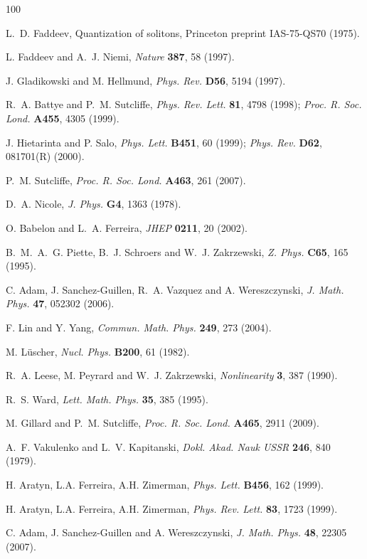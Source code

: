 \documentclass[12pt]{article}
\begin{document}
\begin{thebibliography}{100}


 L.~D. Faddeev,
Quantization of solitons,
Princeton preprint IAS-75-QS70 (1975).

 L. Faddeev and A.~J. Niemi,
\textit{Nature} \textbf{387}, 58 (1997).

 J. Gladikowski and M. Hellmund,
\textit{Phys. Rev.} \textbf{D56}, 5194 (1997).

 R.~A. Battye and P.~M. Sutcliffe,
\textit{Phys. Rev. Lett.} \textbf{81}, 4798 (1998);
\textit{Proc. R. Soc. Lond.} \textbf{A455}, 4305 (1999).

 J. Hietarinta and P. Salo,
\textit{Phys. Lett.} \textbf{B451}, 60 (1999);
\textit{Phys. Rev.} \textbf{D62}, 081701(R) (2000).

 P.~M. Sutcliffe,
\textit{Proc. R. Soc. Lond.} \textbf{A463}, 261 (2007).

 D.~A. Nicole, 
\textit{J. Phys.} \textbf{G4}, 1363 (1978).

O. Babelon and L.~A. Ferreira,
\textit{JHEP} \textbf{0211}, 20 (2002).

B.~M.~A.~G. Piette, B.~J. Schroers and W.~J. Zakrzewski,
\textit{Z. Phys.} \textbf{C65}, 165 (1995).

C. Adam, J. Sanchez-Guillen, R.~A. Vazquez and A. Wereszczynski,
\textit{J. Math. Phys.} \textbf{47}, 052302 (2006).

 F. Lin and Y. Yang,
\textit{Commun. Math. Phys.} \textbf{249}, 273 (2004).

M. L\"uscher, \textit{Nucl. Phys.} \textbf{B200}, 61 (1982).

R.~A. Leese, M. Peyrard and W.~J. Zakrzewski,
\textit{Nonlinearity}  \textbf{3}, 387 (1990).

R.~S. Ward,
\textit{Lett. Math. Phys.} \textbf{35}, 385 (1995).

M. Gillard and P.~M. Sutcliffe,
\textit{Proc. R. Soc. Lond.} \textbf{A465}, 2911 (2009).

A.~F. Vakulenko and L.~V. Kapitanski,
\textit{Dokl. Akad. Nauk USSR} \textbf{246}, 840 (1979).

H. Aratyn, L.A. Ferreira, A.H. Zimerman,
\textit{Phys. Lett.} \textbf{B456}, 162 (1999).

H. Aratyn, L.A. Ferreira, A.H. Zimerman,
\textit{Phys. Rev. Lett.} \textbf{83}, 1723 (1999).

C. Adam, J. Sanchez-Guillen and A. Wereszczynski,
\textit{J. Math. Phys.} \textbf{48}, 22305 (2007).

\end{thebibliography}
\end{document}
